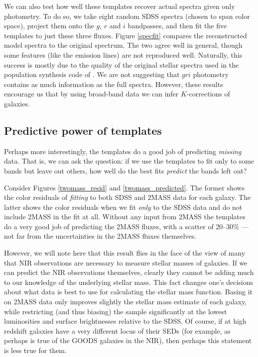 \documentclass[12pt,preprint]{aastex}
\begin{document}
We can also test how well these templates recover actual spectra given
only photometry. To do so, we take eight random SDSS spectra (chosen
to span color space), project them onto the $g$, $r$ and $i$
bandpasses, and then fit the five templates to just these three
fluxes.  Figure \ref{specfit} compares the reconstructed model spectra
to the original spectrum. The two agree well in general, though some
features (like the emission lines) are not reproduced well.
Naturally, this success is mostly due to the quality of the original
stellar spectra used in the population synthesis code of
\citet{bruzual03a}. We are not suggesting that $gri$ photometry
contains as much information as the full spectra. However, these
results encourage us that by using broad-band data we can infer
$K$-corrections of galaxies.

\subsection{Predictive power of templates}

Perhaps more interestingly, the templates do a good job of predicting
{\it missing} data. That is, we can ask the question: if we use the
templates to fit only to some bands but leave out others, how well do
the best fits {\it predict} the bands left out?
    
Consider Figures \ref{twomass_resid} and \ref{twomass_predicted}. The
former shows the color residuals of {\it fitting} to both SDSS and
2MASS data for each galaxy. The latter shows the color residuals when
we fit {\it only} to the SDSS data and do not include 2MASS in the fit
at all. Without any input from 2MASS the templates do a very good job
of predicting the 2MASS fluxes, with a scatter of 20--30\% --- not far
from the uncertainties in the 2MASS fluxes themselves.

However, we will note here that this result flies in the face of the
view of many that NIR observations are necessary to measure stellar
masses of galaxies. If we can predict the NIR observations themselves,
clearly they cannot be adding much to our knowledge of the underlying
stellar mass. This fact changes one's decisions about what data is
best to use for calculating the stellar mass function.  Basing it on
2MASS data only improves slightly the stellar mass estimate of each
galaxy, while restricting (and thus biasing) the sample significantly
at the lowest luminosities and surface brightnesses relative to the
SDSS. Of course, if at high redshift galaxies have a very different
locus of their SEDs (for example, as perhaps is true of the GOODS
galaxies in the NIR), then perhaps this statement is less true for
them.
\end{document}
